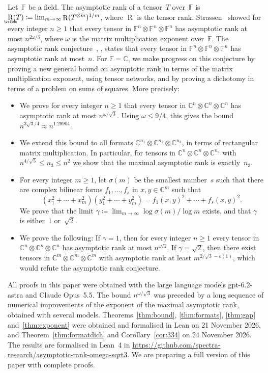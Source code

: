 \documentclass[11pt,letterpaper]{article}
\numberwithin{equation}{section}
\theoremstyle{definition}
\DeclareMathOperator{\tensorrank}{R}
\DeclareMathOperator{\asymprank}{\underaccent{\wtilde}{R}}
\newcommand{\CC}{\mathbb{C}}
\newcommand{\FF}{\mathbb{F}}
\begin{document}
Let~$\FF$ be a field. The asymptotic rank of a tensor~$T$ over~$\FF$ is $\asymprank(T)\coloneqq\lim_{m\to\infty}\tensorrank(T^{\otimes m})^{1/m}$, where
$\tensorrank$ is the tensor rank. Strassen~\cite[Lemma~3.5 and~(1.3)]{strassen1988asymptotic} showed for every integer
$n\ge1$ that every tensor in $\FF^n\otimes\FF^n\otimes\FF^n$ has asymptotic rank at most $n^{2\omega/3}$, where $\omega$ is the
matrix multiplication exponent over~$\FF$. The asymptotic rank conjecture~\cite{MR1341854}, \cite[Problem~15.5]{burgisser1997algebraic}, states that every tensor in
$\FF^n\otimes\FF^n\otimes\FF^n$ has asymptotic rank at most~$n$. For $\FF=\CC$, we make progress on this conjecture by proving a new
general bound on asymptotic rank in terms of the matrix multiplication exponent, using tensor networks, and by proving
a dichotomy in terms of a problem on sums of squares. More precisely:
\begin{itemize}
\item We prove for every integer $n\ge1$ that every tensor in $\CC^n\otimes\CC^n\otimes\CC^n$ has asymptotic rank at most $n^{\omega/\sqrt3}$.
Using $\omega\le9/4$, this gives the bound $n^{3\sqrt3/4}\approx n^{1.29904}$.
\item We extend this bound to all formats $\CC^{n_1}\otimes\CC^{n_2}\otimes\CC^{n_3}$, in terms of rectangular matrix
multiplication. In particular, for tensors in
$\CC^n\otimes\CC^n\otimes\CC^{n_3}$ with $n^{4/\sqrt5}\le n_3\le n^2$ we show that the maximal asymptotic rank is
exactly~$n_3$.
\item For every integer $m\ge1$, let $\sigma(m)$ be the smallest number~$s$ such that there are complex bilinear
forms $f_1,\ldots,f_s$ in $x,y\in\CC^m$ such that
\[
(x_1^2+\cdots+x_m^2)(y_1^2+\cdots+y_m^2)=f_1(x,y)^2+\cdots+f_s(x,y)^2.
\]
We prove that the limit $\gamma\coloneqq\lim_{m\to\infty}\log\sigma(m)/\log m$ exists, and that $\gamma$ is either~$1$
or~$\sqrt2$.
\item We prove the following: If $\gamma=1$, then for every integer $n\ge1$ every tensor in $\CC^n\otimes\CC^n\otimes\CC^n$ has
asymptotic rank at most $n^{\omega/2}$. If $\gamma=\sqrt2$, then there exist tensors in $\CC^m\otimes\CC^m\otimes\CC^m$ with asymptotic rank at least
$m^{2/\sqrt3-o(1)}$, which would refute the asymptotic rank conjecture.
\end{itemize}
All proofs in this paper were obtained with the large language models gpt-6.2-astra and Claude
Opus~5.5. The bound $n^{\omega/\sqrt3}$ was preceded by a long sequence of numerical
improvements of the exponent of the maximal asymptotic rank, obtained with several models. Theorems~\ref{thm:bound}, \ref{thm:formats}, \ref{thm:gap} and~\ref{thm:exponent} were obtained and
formalised in Lean on 21 November 2026, and Theorem~\ref{thm:formatdich} and Corollary~\ref{cor:334} on 24 November 2026. The results are
formalised in Lean~4 in \url{https://github.com/spectra-research/asymptotic-rank-omega-sqrt3}. We are preparing a full version of this paper with complete proofs.
\end{document}
